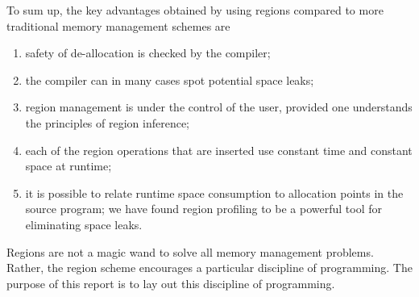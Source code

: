 \documentclass[12pt]{book}
\begin{document}
To sum up, the key advantages obtained by using regions compared to more 
traditional memory management schemes are
\begin{enumerate}
\item safety of de-allocation is checked by the compiler;
\item the compiler can in many cases spot potential space leaks;
\item region management is under the control of the user, provided
      one understands the principles of region inference;
\item each of the region operations that are inserted use
      constant time and constant space at runtime;
\item it is possible to relate runtime space consumption 
      to allocation points in the source program; we have found
      region profiling to be a powerful tool for eliminating
      space leaks.
\end{enumerate}
Regions are not a magic wand to solve all memory management
problems. Rather, the region scheme encourages a  particular
discipline of programming. The purpose of this report is
to lay out this discipline of programming.
\end{document}
